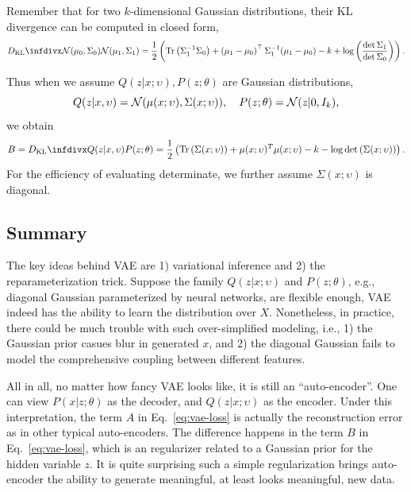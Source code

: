 \documentclass{article}
\begin{document}
Remember that for two $k$-dimensional Gaussian distributions, their KL divergence can be computed in
closed form,
\begin{equation}
    \kld{\Ncal(\mu_0,\Sigma_0)}{\Ncal(\mu_1,\Sigma_1)} = \frac{1}{2} \left( \tr \left( \Sigma_1^{-1} \Sigma_0 \right)
    + \left( \mu_1 - \mu_0\right)^\top \Sigma_1^{-1} ( \mu_1 - \mu_0 )
    - k + \log \left( \frac{ \det \Sigma_1 }{ \det \Sigma_0  } \right) \right).
\end{equation}

Thus when we assume $Q(z|x;\upsilon), P(z;\theta)$ are Gaussian distributions,
\begin{equation}
    Q(z|x,\upsilon) = \mathcal{N}(\mu(x;\upsilon),\Sigma(x;\upsilon)),\quad P(z;\theta) = \mathcal{N}(z|0, I_k),
\end{equation}
we obtain
\begin{equation}
    B = \kld{Q(z|x,\upsilon)}{P(z;\theta)} = \half \left( \tr \left( \Sigma(x;\upsilon) \right)
    + \mu(x;\upsilon)^T \mu(x;\upsilon) - k - \log\det\left( \Sigma(x;\upsilon) \right) \right).
\end{equation}
For the efficiency of evaluating determinate, we further assume $\Sigma(x;\upsilon)$ is diagonal.

\subsection{Summary}
The key ideas behind VAE are 1) variational inference and 2) the reparameterization trick.
Suppose the family $Q(z|x;\upsilon)$ and $P(z;\theta)$, e.g., diagonal Gaussian parameterized by neural networks, are flexible enough, VAE indeed has the ability to learn the distribution over $X$.
Nonetheless, in practice, there could be much trouble with such over-simplified modeling, i.e., 1) the Gaussian prior casues blur in generated $x$, and 2) the diagonal Gaussian fails to model the comprehensive coupling between different features.

All in all, no matter how fancy VAE looks like, it is still an ``auto-encoder''. 
One can view $P(x|z;\theta)$ as the decoder, and $Q(z|x;\upsilon)$ as the encoder.
Under this interpretation, the term $A$ in Eq.~\eqref{eq:vae-loss} is actually the reconstruction error as in other typical auto-encoders. The difference happens in the term $B$ in Eq.~\eqref{eq:vae-loss}, which is an regularizer related to a Gaussian prior for the hidden variable $z$.
It is quite surprising such a simple regularization brings auto-encoder the ability to generate meaningful, at least looks meaningful, new data.



\end{document}
